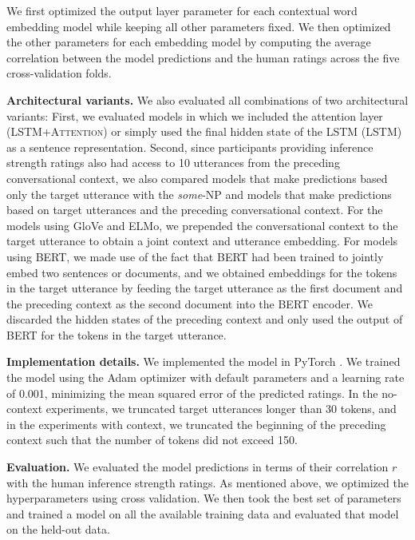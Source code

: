 \documentclass[11pt,a4paper]{article}
\begin{document}
We first optimized the output layer parameter for each contextual word embedding model while keeping all other parameters fixed. We then optimized the other parameters for each embedding model by computing the average correlation between the model predictions and the human ratings across the five cross-validation folds. 



\noindent \textbf{Architectural variants.} We also evaluated all combinations of two architectural variants: First, we evaluated models in which we included the attention layer (\textsc{LSTM+Attention}) or simply used the final hidden state of the LSTM (\textsc{LSTM}) as a sentence representation. Second, since participants providing inference strength ratings also had access to 10 utterances from the  preceding conversational context, we also compared models that make predictions based only the target utterance with the \emph{some}-NP and models that make predictions based on target utterances and the preceding conversational context. 
For the models using GloVe and ELMo, we prepended the conversational context to the target utterance to obtain a joint context and utterance embedding. For models using BERT, we made use of the fact that BERT had been trained to jointly embed two sentences or documents, and we obtained embeddings for the tokens in the target utterance by feeding the target utterance as the first document and the preceding context as the second document into the BERT encoder. 
We discarded the hidden states of the preceding context and only used the output of BERT for the tokens in the target utterance.




\noindent \textbf{Implementation details.} We implemented the model in PyTorch \cite{paszke2017automatic}. We trained the model using the Adam optimizer \cite{kingma2014adam} with default parameters and a learning rate of 0.001, minimizing the mean squared error of the predicted ratings. 
In the no-context experiments, we truncated target utterances longer than 30 tokens, and in the experiments with context, we truncated the beginning of the preceding context such that the number of tokens did not exceed 150.



\noindent \textbf{Evaluation.} We evaluated the model predictions in terms of their correlation $r$ with the human inference strength ratings.
As mentioned above, we optimized the hyperparameters using cross validation. We then took 
the best set of parameters and trained a model on all the available training data and evaluated that model on the held-out data.
\end{document}
